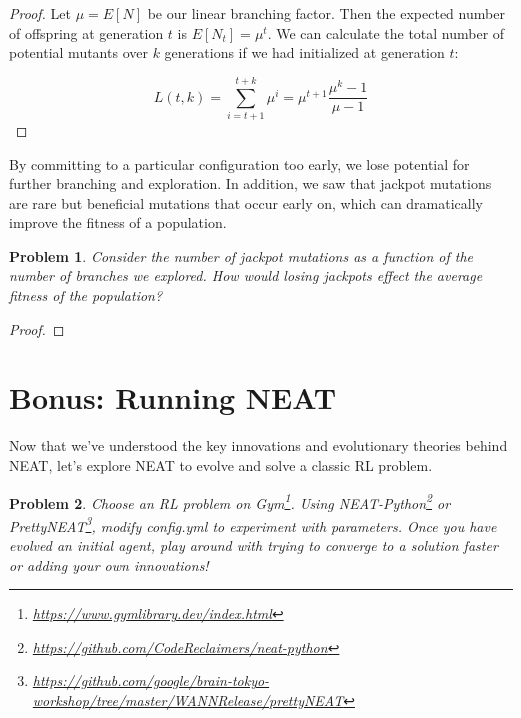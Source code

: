 \documentclass[12pt]{article}
\newtheorem{problem}{Problem}
\begin{document}
\begin{proof}
Let $\mu=E[N]$ be our linear branching factor. Then the expected number of offspring at generation $t$ is $E[N_t]=\mu^t$. We can calculate the total number of potential mutants over $k$ generations if we had initialized at generation $t$:

$$L(t,k)=\sum_{i=t+1}^{t+k} \mu^i=\mu^{t+1}\frac{\mu^k-1}{\mu-1}$$
\end{proof}

By committing to a particular configuration too early, we lose potential for further branching and exploration. In addition, we saw that jackpot mutations are rare but beneficial mutations that occur early on, which can dramatically improve the fitness of a population.

\begin{problem}
Consider the number of jackpot mutations as a function of the number of branches we explored. How would losing jackpots effect the average fitness of the population?
\end{problem}

\begin{proof}

\end{proof}


\section{Bonus: Running NEAT}

Now that we've understood the key innovations and evolutionary theories behind NEAT, let's explore NEAT to evolve and solve a classic RL problem.

\begin{problem}
Choose an RL problem on Gym\footnote{\url{https://www.gymlibrary.dev/index.html}}. Using NEAT-Python\footnote{\url{https://github.com/CodeReclaimers/neat-python}} or PrettyNEAT\footnote{\url{https://github.com/google/brain-tokyo-workshop/tree/master/WANNRelease/prettyNEAT}}, modify config.yml to experiment with parameters. Once you have evolved an initial agent, play around with trying to converge to a solution faster or adding your own innovations!
\end{problem}
\end{document}
